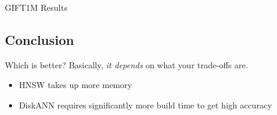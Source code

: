 \begin{frame}{GIFT1M Results}
    
\end{frame}

\subsection{Conclusion}

\begin{frame}{Which is better?}
    Basically, \textit{it depends} on what your trade-offs are.
    \begin{itemize}
        \item HNSW takes up more memory
        \item DiskANN requires significantly more build time to get high accuracy
    \end{itemize}
\end{frame}
